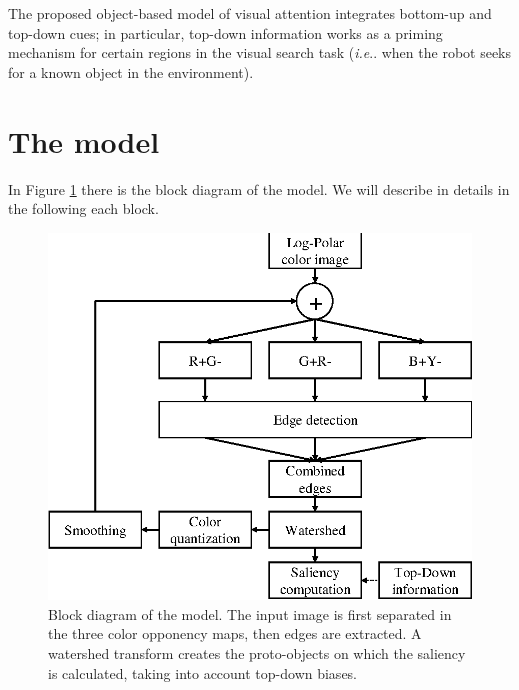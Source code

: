 \documentclass{llncs}
\makeatletter
\DeclareRobustCommand\onedot{\futurelet\@let@token\@onedot}
\def\@onedot{\ifx\@let@token.\else.\null\fi\xspace}
\def\ie{\emph{i.e}\onedot} \def\Ie{\emph{I.e}\onedot}
\makeatother
\begin{document}
The proposed object-based model of visual
attention integrates bottom-up and top-down cues;
in particular, top-down information works as a priming
mechanism for certain regions in the visual search task
(\ie when the robot seeks for a known object in the environment).



\section{The model}
\label{sec:att_model}
In Figure \ref{fig:model_diagram} there is the block diagram of the model.
We will describe in details in the following each block.

\begin{figure}[]
  \begin{center}
    \includegraphics[width=0.6\linewidth]{./figs/attention/schema}
    \caption{Block diagram of the model. The input image is first separated in
     the three color opponency maps, then edges are extracted. A watershed transform
     creates the proto-objects on which the saliency is calculated,
     taking into account top-down biases.}
     \label{fig:model_diagram}
  \end{center}
\end{figure}
\end{document}
